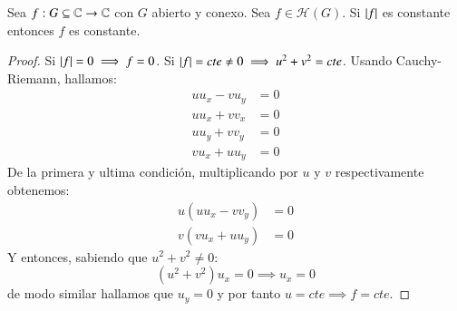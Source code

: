 \begin{pro}
    Sea $f: G \subseteq \mathbb{C} \to \mathbb{C}$ con $G$ abierto y conexo. Sea $f \in \mathcal{H}(G)$. Si $\left|f\right|$ es constante entonces $f$ es constante.
\end{pro}
\begin{proof}
    Si $\left|f\right| = 0 \implies f = 0$.
    Si $\left|f\right| = cte \neq 0 \implies u^2 + v^2 = cte$.
    Usando Cauchy-Riemann, hallamos:
    \begin{align*}
        uu_x - vu_y &= 0\\
        uu_x + vv_x &= 0\\
        uu_y + vv_y &= 0\\
        vu_x + uu_y &= 0
    \end{align*}
    De la primera y ultima condición, multiplicando por $u$ y $v$ respectivamente obtenemos:
    \begin{align*}
        u(uu_x - vv_y) &= 0\\
        v(vu_x + uu_y) &= 0
    \end{align*}
    Y entonces, sabiendo que $u^2+v^2 \neq 0$:
    $$
        (u^2 + v^2) u_x = 0 \implies u_x = 0
    $$
    de modo similar hallamos que $u_y = 0$ y por tanto $u = cte \implies f = cte$.
\end{proof}
